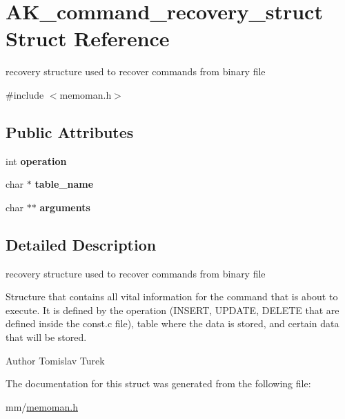 \hypertarget{structAK__command__recovery__struct}{\section{A\+K\+\_\+command\+\_\+recovery\+\_\+struct Struct Reference}
\label{structAK__command__recovery__struct}
}


recovery structure used to recover commands from binary file  




{\ttfamily \#include $<$memoman.\+h$>$}

\subsection*{Public Attributes}
\begin{DoxyCompactItemize}
\item 
\hypertarget{structAK__command__recovery__struct_a18dc268f00bb5f619e36f2f9fda39dc9}{int {\bfseries operation}}\label{structAK__command__recovery__struct_a18dc268f00bb5f619e36f2f9fda39dc9}

\item 
\hypertarget{structAK__command__recovery__struct_a0c5acb9c190dc8e6ff8cf116d4d20851}{char $\ast$ {\bfseries table\+\_\+name}}\label{structAK__command__recovery__struct_a0c5acb9c190dc8e6ff8cf116d4d20851}

\item 
\hypertarget{structAK__command__recovery__struct_ace43b855af22c421103d9cd595347db4}{char $\ast$$\ast$ {\bfseries arguments}}\label{structAK__command__recovery__struct_ace43b855af22c421103d9cd595347db4}

\end{DoxyCompactItemize}


\subsection{Detailed Description}
recovery structure used to recover commands from binary file 

Structure that contains all vital information for the command that is about to execute. It is defined by the operation (I\+N\+S\+E\+R\+T, U\+P\+D\+A\+T\+E, D\+E\+L\+E\+T\+E that are defined inside the const.\+c file), table where the data is stored, and certain data that will be stored. \begin{DoxyAuthor}{Author}
Tomislav Turek 
\end{DoxyAuthor}


The documentation for this struct was generated from the following file\+:\begin{DoxyCompactItemize}
\item 
mm/\hyperlink{memoman_8h}{memoman.\+h}\end{DoxyCompactItemize}
